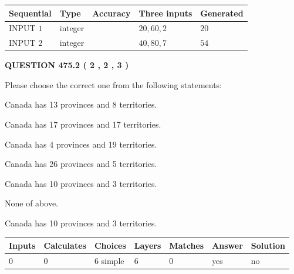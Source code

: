 \documentclass[12pt]{article}
\begin{document}
  
\noindent\begin{tabular}{|l|l|l|l|l|}
\hline
 Sequential & Type & Accuracy & Three inputs & Generated \\ 
\hline
 
 
  INPUT $  1 $ & integer &  & $
 20
 , 
 60
 , 
 2
 $ & $ 20 $ 
 \\  \hline  
 
 
  INPUT $  2 $ & integer &  & $
 40
 , 
 80
 , 
 7
 $ & $ 54 $ 
 \\  \hline  
 \end{tabular}
   
   
  
\vspace{0.2in}
  
{\textbf{\Large{QUESTION
475.2 
 ( 2 , 2 , 3 )
}}}
  
  
Please choose the correct one from the following statements:
 
 
Canada has  13 provinces and  8 territories.
 
 
Canada has  17 provinces and  17 territories.
 
 
Canada has   4 provinces and  19 territories.
 
 
Canada has  26 provinces and  5 territories.
 
 
Canada has 10  provinces and 3 territories.
 
 
 None of above.
 
 
\noindent{}
 
 
Canada has 10  provinces and 3 territories.
 
 
\noindent{}
 
 
   
   
   
   
\noindent\begin{tabular}{|l|l|l|l|l|l|l|}
 \hline
Inputs & Calculates & Choices & Layers & Matches & Answer & Solution \\ \hline
 0  & 
 0  & 
 6
  simple  
  & 
 6  & 
 0  & 
  yes & 
  no 
  \\ \hline
 \end{tabular}
   
\end{document}
